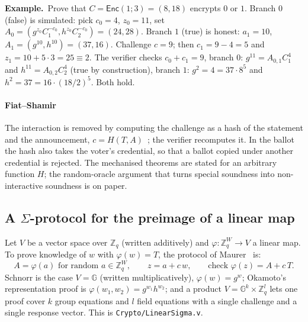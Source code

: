 \documentclass[11pt,a4paper]{article}
\newcommand{\G}{\mathbb{G}}
\newcommand{\Z}{\mathbb{Z}}
\newcommand{\Enc}{\mathsf{Enc}}
\newcommand{\rocq}[1]{\texttt{#1}}
\newcommand{\ex}[1]{\par\medskip\noindent\textbf{Example.}~#1\par\medskip}
\theoremstyle{remark}
\begin{document}
\ex{Prove that $C = \Enc(1; 3) = (8, 18)$ encrypts $0$ or $1$. Branch $0$
(false) is simulated: pick $c_0 = 4$, $z_0 = 11$, set $A_0 = (g^{z_0}
C_1^{-c_0}, h^{z_0} C_2^{-c_0}) = (24, 28)$. Branch $1$ (true) is honest:
$a_1 = 10$, $A_1 = (g^{10}, h^{10}) = (37, 16)$. Challenge $c = 9$; then
$c_1 = 9 - 4 = 5$ and $z_1 = 10 + 5 \cdot 3 = 25 \equiv 2$. The verifier
checks $c_0 + c_1 = 9$, branch $0$: $g^{11} = A_{0,1} C_1^{4}$ and
$h^{11} = A_{0,2} C_2^{4}$ (true by construction), branch $1$: $g^{2} = 4 =
37 \cdot 8^{5}$ and $h^{2} = 37 = 16 \cdot (18 / 2)^{5}$. Both hold.}

\paragraph{Fiat--Shamir} The interaction is removed by computing the
challenge as a hash of the statement and the announcement, $c = H(T,
A)$~\cite{fiatshamir};
the verifier recomputes it. In the ballot the hash also takes the voter's
credential, so that a ballot copied under another credential is rejected.
The mechanised theorems are stated for an arbitrary function $H$; the
random-oracle argument that turns special soundness into non-interactive
soundness is on paper.

\subsection{A $\Sigma$-protocol for the preimage of a linear map}\label{sec:linsigma}
Let $V$ be a vector space over $\Z_q$ (written additively) and $\varphi :
\Z_q^W \to V$ a linear map. To prove knowledge of $w$ with $\varphi(w) =
T$, the protocol of Maurer~\cite{maurer} is:
\[
  A = \varphi(a) \text{ for random } a \in \Z_q^W, \qquad
  z = a + c\,w, \qquad
  \text{check } \varphi(z) = A + c\,T .
\]
Schnorr is the case $V = \G$ (written multiplicatively), $\varphi(w) =
g^w$; Okamoto's representation proof is $\varphi(w_1, w_2) = g^{w_1}
h^{w_2}$; and a product $V = \G^{k} \times \Z_q^{l}$ lets one proof cover
$k$ group equations and $l$ field equations with a single challenge and a
single response vector. This is \rocq{Crypto/LinearSigma.v}.
\end{document}
